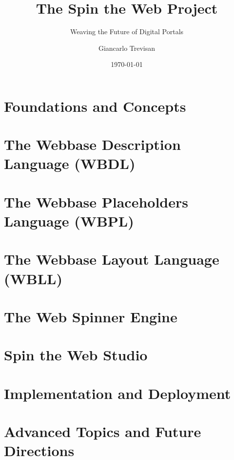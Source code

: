 \documentclass[11pt,openright,twoside,a4paper]{book}
\title{The Spin the Web Project}
\subtitle{Weaving the Future of Digital Portals}
\author{Giancarlo Trevisan}
\date{\today}
\begin{document}
\frontmatter




\tableofcontents

\mainmatter

\part{Foundations and Concepts}





\part{The Webbase Description Language (WBDL)}


\part{The Webbase Placeholders Language (WBPL)}


\part{The Webbase Layout Language (WBLL)}


\part{The Web Spinner Engine}


\part{Spin the Web Studio}


\part{Implementation and Deployment}


\part{Advanced Topics and Future Directions}


\appendix


\backmatter


\printindex
\end{document}
